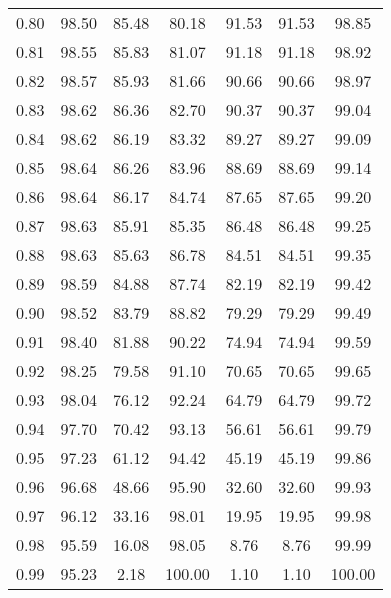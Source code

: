 \begin{tabular}{|c|c|c|c|c|c|c|}
      0.80 &     98.50 &     85.48 &      80.18 &   91.53 &      91.53 &         98.85 \\
      0.81 &     98.55 &     85.83 &      81.07 &   91.18 &      91.18 &         98.92 \\
      0.82 &     98.57 &     85.93 &      81.66 &   90.66 &      90.66 &         98.97 \\
      0.83 &     98.62 &     86.36 &      82.70 &   90.37 &      90.37 &         99.04 \\
      0.84 &     98.62 &     86.19 &      83.32 &   89.27 &      89.27 &         99.09 \\
      0.85 &     98.64 &     86.26 &      83.96 &   88.69 &      88.69 &         99.14 \\
      0.86 &     98.64 &     86.17 &      84.74 &   87.65 &      87.65 &         99.20 \\
      0.87 &     98.63 &     85.91 &      85.35 &   86.48 &      86.48 &         99.25 \\
      0.88 &     98.63 &     85.63 &      86.78 &   84.51 &      84.51 &         99.35 \\
      0.89 &     98.59 &     84.88 &      87.74 &   82.19 &      82.19 &         99.42 \\
      0.90 &     98.52 &     83.79 &      88.82 &   79.29 &      79.29 &         99.49 \\
      0.91 &     98.40 &     81.88 &      90.22 &   74.94 &      74.94 &         99.59 \\
      0.92 &     98.25 &     79.58 &      91.10 &   70.65 &      70.65 &         99.65 \\
      0.93 &     98.04 &     76.12 &      92.24 &   64.79 &      64.79 &         99.72 \\
      0.94 &     97.70 &     70.42 &      93.13 &   56.61 &      56.61 &         99.79 \\
      0.95 &     97.23 &     61.12 &      94.42 &   45.19 &      45.19 &         99.86 \\
      0.96 &     96.68 &     48.66 &      95.90 &   32.60 &      32.60 &         99.93 \\
      0.97 &     96.12 &     33.16 &      98.01 &   19.95 &      19.95 &         99.98 \\
      0.98 &     95.59 &     16.08 &      98.05 &    8.76 &       8.76 &         99.99 \\
      0.99 &     95.23 &      2.18 &     100.00 &    1.10 &       1.10 &        100.00 \\
\bottomrule
\end{tabular}
